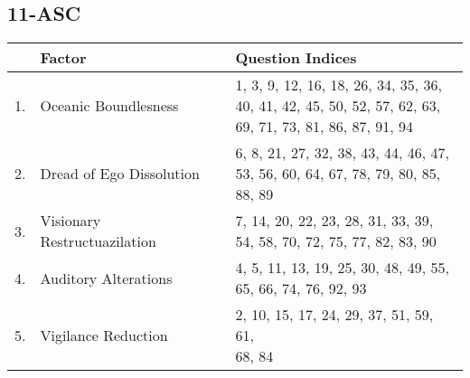 \subsection*{\acf{11-ASC}}
\begin{center}
\begin{tabular}{r @{ } l l}
    & \bfseries Factor & \bfseries Question Indices \\
    \hline\arrayrulecolor{hlinegray}
    1. & Oceanic Boundlesness         & \makecell[l]{1, 3, 9, 12, 16, 18, 26, 34, 35, 36, \\ 40, 41, 42, 45, 50, 52, 57, 62, 63, \\ 69, 71, 73, 81, 86, 87, 91, 94} \\
    \hline
    2. & Dread of Ego Dissolution     & \makecell[l]{6, 8, 21, 27, 32, 38, 43, 44, 46, 47, \\ 53, 56, 60, 64, 67, 78, 79, 80, 85, \\ 88, 89} \\
    \hline
    3. & Visionary Restructuazilation & \makecell[l]{7, 14, 20, 22, 23, 28, 31, 33, 39, \\ 54, 58, 70, 72, 75, 77, 82, 83, 90} \\
    \hline
    4. & Auditory Alterations         & \makecell[l]{4, 5, 11, 13, 19, 25, 30, 48, 49, 55, \\ 65, 66, 74, 76, 92, 93} \\
    \hline
    5. & Vigilance Reduction          & \makecell[l]{2, 10, 15, 17, 24, 29, 37, 51, 59, 61, \\ 68, 84} \\
\end{tabular}
\end{center}
